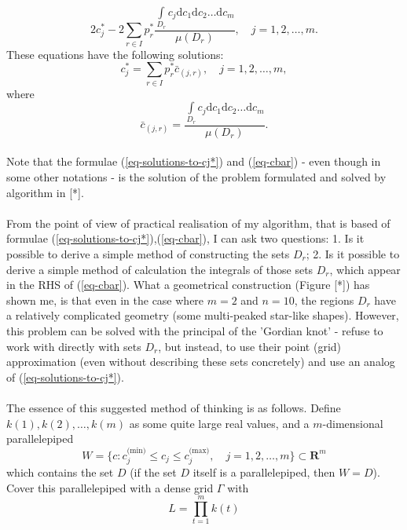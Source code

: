 \documentclass[a4paper]{article}
\numberwithin{equation}{subsection}
\begin{document}
\begin{equation}
2 c_{j}^{*} - 2 \sum\limits_{r \in I} p_{r}^{*}\frac{\int\limits_{D_{r}} c_{j}\mathrm{d}c_{1}\mathrm{d}c_{2}\dots\mathrm{d}c_{m}}{\mu(D_{r})} , \quad j = 1,2,\dots,m.
\end{equation}
These equations have the following solutions:
\begin{equation}
c_{j}^{*} = \sum\limits_{r \in I} p_{r}^{*} \bar{c}_{(j,r)}, \quad j = 1,2,\dots,m, \label{eq-solutions-to-cj*}
\end{equation}
where
\begin{equation}
\bar{c}_{(j,r)} = \frac{\int\limits_{D_{r}} c_{j}\mathrm{d}c_{1}\mathrm{d}c_{2}\dots\mathrm{d}c_{m}}{\mu(D_{r})}. \label{eq-cbar}
\end{equation}
\\
Note that the formulae (\ref{eq-solutions-to-cj*}) and (\ref{eq-cbar}) - even though in some other notations - is the solution of the problem formulated and solved by algorithm in [*].\\
\\
From the point of view of practical realisation of my algorithm, that is based of formulae (\ref{eq-solutions-to-cj*}),(\ref{eq-cbar}), I can ask two questions: 1. Is it possible to derive a simple method of constructing the sets $D_{r}$; 2. Is it possible to derive a simple method of calculation the integrals of those sets $D_{r}$, which appear in the RHS of (\ref{eq-cbar}). What a geometrical construction (Figure [*]) has shown me, is that even in the case where $m=2$ and $n=10$, the regions $D_{r}$ have a relatively complicated geometry (some multi-peaked star-like shapes). However, this problem can be solved with the principal of the 'Gordian knot' - refuse to work with directly with sets $D_{r}$, but instead, to use their point (grid) approximation (even without describing these sets concretely) and use an analog of (\ref{eq-solutions-to-cj*}).\\
\\
The essence of this suggested method of thinking is as follows. Define $k(1),k(2),\dots,k(m)$ as some quite large real values, and a $m$-dimensional parallelepiped
\begin{equation}
W=\{ c:c_{j}^{(\text{min)}} \leq c_{j} \leq c_{j}^{(\text{max)}}, \quad j=1,2,\dots,m \}\subset \boldsymbol{R}^{m}
\end{equation}
which contains the set $D$ (if the set $D$ itself is a parallelepiped, then $W=D$). Cover this parallelepiped with a dense grid $\Gamma$ with
\begin{equation}
L = \prod\limits_{t=1}^{m}k(t)
\end{equation}
\end{document}
